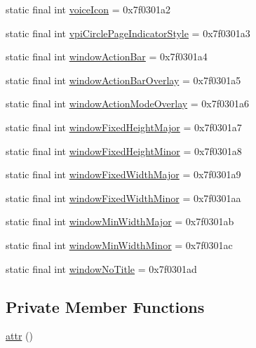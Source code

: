 \begin{DoxyCompactItemize}
static final int \mbox{\hyperlink{classcom_1_1synnapps_1_1carouselview_1_1_r_1_1attr_a8c78c6e26273b1accd41f7ed5afee6a6}{voice\+Icon}} = 0x7f0301a2
\item 
static final int \mbox{\hyperlink{classcom_1_1synnapps_1_1carouselview_1_1_r_1_1attr_a8a14d55961a5d2086e034d82b5b414d9}{vpi\+Circle\+Page\+Indicator\+Style}} = 0x7f0301a3
\item 
static final int \mbox{\hyperlink{classcom_1_1synnapps_1_1carouselview_1_1_r_1_1attr_a05e2e303c9916371b539b0e78fddf706}{window\+Action\+Bar}} = 0x7f0301a4
\item 
static final int \mbox{\hyperlink{classcom_1_1synnapps_1_1carouselview_1_1_r_1_1attr_aab77de5e9abe84ee5c6cd74ba1acad26}{window\+Action\+Bar\+Overlay}} = 0x7f0301a5
\item 
static final int \mbox{\hyperlink{classcom_1_1synnapps_1_1carouselview_1_1_r_1_1attr_ada7a9bcc043c201ab45994cfc347ce7c}{window\+Action\+Mode\+Overlay}} = 0x7f0301a6
\item 
static final int \mbox{\hyperlink{classcom_1_1synnapps_1_1carouselview_1_1_r_1_1attr_a92b514b7c662d2fb286e41ce2d6e4483}{window\+Fixed\+Height\+Major}} = 0x7f0301a7
\item 
static final int \mbox{\hyperlink{classcom_1_1synnapps_1_1carouselview_1_1_r_1_1attr_a1cb9923a6b4849e3e3b4e7796bd6f072}{window\+Fixed\+Height\+Minor}} = 0x7f0301a8
\item 
static final int \mbox{\hyperlink{classcom_1_1synnapps_1_1carouselview_1_1_r_1_1attr_ada54b8280aed3141ec16038f9c45cd13}{window\+Fixed\+Width\+Major}} = 0x7f0301a9
\item 
static final int \mbox{\hyperlink{classcom_1_1synnapps_1_1carouselview_1_1_r_1_1attr_a816d81b387d224d8180a8b04c861fe31}{window\+Fixed\+Width\+Minor}} = 0x7f0301aa
\item 
static final int \mbox{\hyperlink{classcom_1_1synnapps_1_1carouselview_1_1_r_1_1attr_acc56d87a22a490715add6dd893322f28}{window\+Min\+Width\+Major}} = 0x7f0301ab
\item 
static final int \mbox{\hyperlink{classcom_1_1synnapps_1_1carouselview_1_1_r_1_1attr_ae23c563c7df1a4e2e2bc9dc940bf8dd8}{window\+Min\+Width\+Minor}} = 0x7f0301ac
\item 
static final int \mbox{\hyperlink{classcom_1_1synnapps_1_1carouselview_1_1_r_1_1attr_ac720f6e5c3344091e6e2da6b44180255}{window\+No\+Title}} = 0x7f0301ad
\end{DoxyCompactItemize}
\subsection*{Private Member Functions}
\begin{DoxyCompactItemize}
\item 
\mbox{\hyperlink{classcom_1_1synnapps_1_1carouselview_1_1_r_1_1attr_a8e1528e1fec43ff7b3211077bd659663}{attr}} ()
\end{DoxyCompactItemize}


